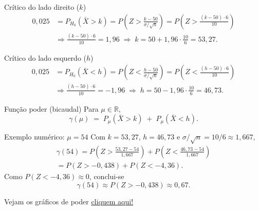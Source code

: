 \documentclass[12pt]{beamer}
\begin{document}
\begin{frame}{}
	\begin{block}{Crítico do lado direito ($k$)}
		\justifying
		\begin{align*}
			0{,}025 &= P_{H_0}(\bar X>k) = P\!\left(Z > \frac{k-50}{\sigma/\sqrt{n}}\right)
			= P\!\left(Z > \frac{(k-50)\cdot 6}{10}\right) \\
			&\Rightarrow \frac{(k-50)\cdot 6}{10} = 1{,}96
			\;\Rightarrow\; k = 50 + 1{,}96\cdot \frac{10}{6} = 53{,}27.
		\end{align*}
	\end{block}
	\pause
	\begin{block}{Crítico do lado esquerdo ($h$)}
		\justifying
		\begin{align*}
			0{,}025 &= P_{H_0}(\bar X<h) = P\!\left(Z < \frac{h-50}{\sigma/\sqrt{n}}\right)
			= P\!\left(Z < \frac{(h-50)\cdot 6}{10}\right) \\
			&\Rightarrow \frac{(h-50)\cdot 6}{10} = -1{,}96
			\;\Rightarrow\; h = 50 - 1{,}96\cdot \frac{10}{6} = 46{,}73.
		\end{align*}
	\end{block}
\end{frame}

\begin{frame}{}
	\begin{block}{Função poder (bicaudal)}
		\justifying
		Para $\mu\in\mathbb{R}$,
		\[
		\gamma(\mu) \;=\; P_{\mu}(\bar X>k) \;+\; P_{\mu}(\bar X<h).
		\]
	\end{block}
	\pause
	\begin{block}{Exemplo numérico: $\mu=54$}
		\justifying
		Com $k=53{,}27$, $h=46{,}73$ e $\sigma/\sqrt{n}=10/6\approx 1{,}667$,
		\begin{align*}
		\gamma(54) = P\!\left(Z>\frac{53{,}27-54}{1{,}667}\right) + P\!\left(Z<\frac{46{,}73-54}{1{,}667}\right)\\
		= P(Z>-0{,}438) + P(Z<-4{,}36).
		\end{align*}
		Como $P(Z<-4{,}36)\approx 0$, conclui-se
		\[
		\gamma(54)\approx P(Z>-0{,}438)\approx 0{,}67.
		\]
	\end{block}
\end{frame}


\begin{frame}{}
	\begin{block}{}
		Vejam os gráficos de poder \href{https://est711.shinyapps.io/FuncaoPoder/}{cliquem aqui!}
	\end{block}
\end{frame}
\end{document}
